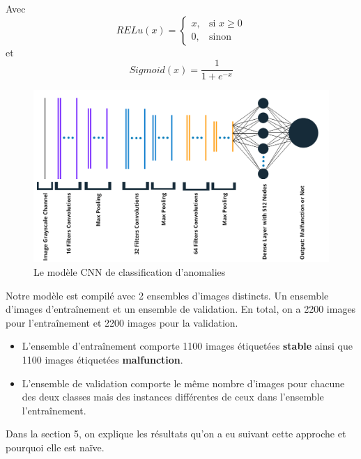 \documentclass[french]{article}
\theoremstyle{mytheoremstyle}
\theoremstyle{mytheoremstyle}
\theoremstyle{myproblemstyle}
\begin{document}
        Avec 
        \[
        RELu(x) = \begin{cases}
            x,& \text{si } x \ge 0\\
            0,& \text{sinon}
        \end{cases}
        \]
        et
        \[
        Sigmoid(x) = \dfrac{1}{1+e^{-x}}
        \]
        \begin{figure}[H]
            \centering
            \includegraphics[width=\textwidth]{images/cnn.png}
            \caption{Le modèle CNN de classification d'anomalies}
            \label{}
        \end{figure}
        Notre modèle est compilé avec 2 ensembles d'images distincts. Un ensemble d'images d'entraînement et un ensemble de validation. En total, on a 2200 images pour l'entraînement et 2200 images pour la validation.
        \newline
        \begin{itemize}
            \item L'ensemble d'entraînement comporte 1100 images étiquetées \textbf{stable} ainsi que 1100 images étiquetées \textbf{malfunction}.
            \item L'ensemble de validation comporte le même nombre d'images pour chacune des deux classes mais des instances différentes de ceux dans l'ensemble l'entraînement.
        \end{itemize}
        Dans la section 5, on explique les résultats qu'on a eu suivant cette approche et pourquoi elle est naïve.
\end{document}
